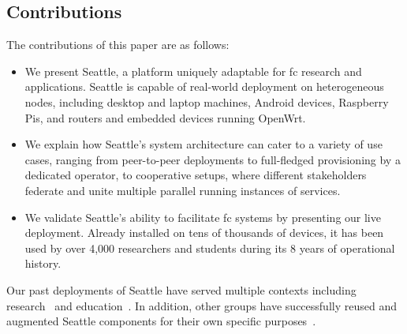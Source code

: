 \subsection{Contributions}

The contributions of this paper are as follows:
\begin{itemize}
\item We present Seattle, a platform uniquely adaptable for
\gls{fc} research and applications. Seattle is
capable of real-world deployment on heterogeneous nodes,
including desktop and laptop machines, Android devices,
Raspberry Pis,
and routers and embedded devices running OpenWrt.
\item We explain how
Seattle's system architecture can cater to a variety of use cases,
ranging from peer-to-peer deployments to full-fledged
provisioning by a dedicated operator, to cooperative setups,
where different stakeholders federate and unite multiple parallel running
instances of services.
\item We validate Seattle's ability to facilitate \gls{fc} systems by
presenting our live deployment. Already installed on tens of thousands of
devices, it has been used by over 4,000 researchers and students during its
8 years of operational history.
\end{itemize}
Our past deployments of Seattle have served multiple contexts
including research~\cite{li2015fence,rafetseder2013sensorium,zhuang2014sensibility,Eisl1010:Service,Tuts1010:Sustained,collares2011smart,zhuang2015privacy,cappos2014blursense,7133607} and education~\cite{Wallace_CCSC_2011,Cappos_CCSCCP_2010,Cappos_CCSCNW_2009,Cappos_SIGCSE_2014,Hooshangi_SIGCSE_2015}.
In addition, other groups have successfully reused and augmented Seattle components
for their own specific purposes~\cite{chard2010social,chard12ssc,caton2014social,muller2014tomato,tomato,eittenberger2012doubtless,zhuang2012distributed,zhuang2014taking,tredger2013building}.

